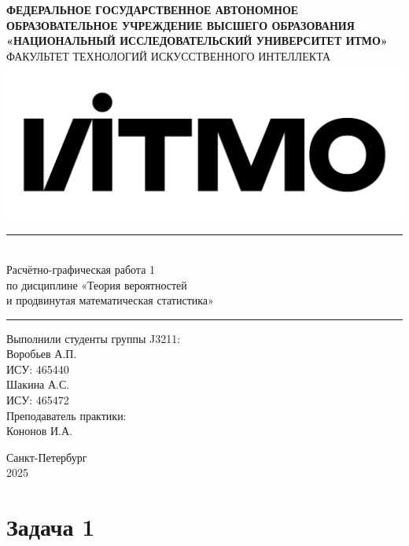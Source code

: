 \documentclass[a4paper,14pt]{extarticle}
\begin{document}
    \thispagestyle{empty}
    \begin{center}
    {\Large\textbf{ФЕДЕРАЛЬНОЕ ГОСУДАРСТВЕННОЕ АВТОНОМНОЕ ОБРАЗОВАТЕЛЬНОЕ УЧРЕЖДЕНИЕ ВЫСШЕГО ОБРАЗОВАНИЯ}}
        \\
        {\Large\textbf{«НАЦИОНАЛЬНЫЙ ИССЛЕДОВАТЕЛЬСКИЙ УНИВЕРСИТЕТ ИТМО»}}\\[5mm]
        {\large ФАКУЛЬТЕТ ТЕХНОЛОГИЙ ИСКУССТВЕННОГО ИНТЕЛЛЕКТА}\\[5mm]
        \includegraphics[scale=0.14]{logo.png}\\[10mm]
        \rule{\textwidth}{0.4mm}\\[3mm]
        {\Large Расчётно-графическая работа \textnumero{} 1 }\\[3mm]
        {\Large по дисциплине «Теория вероятностей }\\[3mm]
        {\Large и продвинутая математическая статистика» }\\[3mm]
        \rule{\textwidth}{0.4mm}
    \end{center}
    \vfill
    \begin{flushright}
        \large Выполнили студенты группы J3211: \\
        Воробьев А.П. \\
        ИСУ: 465440 \\
        Шакина А.С. \\
        ИСУ: 465472 \\
        Преподаватель практики: \\
        Кононов И.А.
    \end{flushright}
    \vfill
    \begin{center}
        \large Санкт-Петербург \\
        \large 2025
    \end{center}
    \newpage


    
    
    \section*{Задача 1}
        
\end{document}
